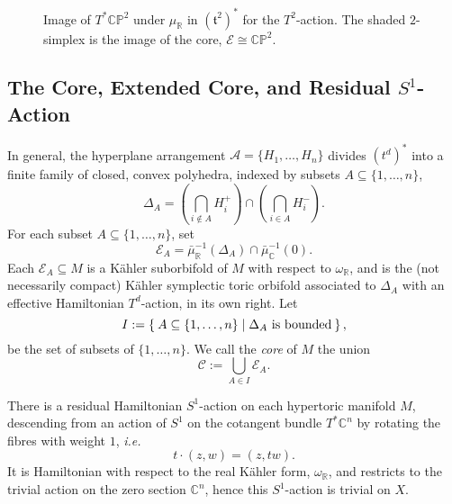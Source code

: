 \documentclass{amsart}
\newcommand{\ie}{\emph{i.e.} }
\newcommand{\w}{\omega}
\newcommand{\PP}{\mathbb{P}}
\newcommand{\RR}{\mathbb{R}}
\newcommand{\CC}{\mathbb{C}}
\newcommand{\mcA}{\mathcal{A}}
\newcommand{\mcC}{\mathcal{C}}
\newcommand{\mcE}{\mathcal{E}}
\newcommand{\mft}{\mathfrak{t}}
\begin{document}
	\begin{figure}[h!]
		\centering
		\caption{Image of $T^{\ast}\CC\PP^{2}$ under $\mu_{\RR}$ in $(\mft^{2})^{\ast}$ for the $T^{2}$-action. The shaded $2$-simplex is the image of the core, $\mcE \cong \CC\PP^{2}$.} \label{fig:TCP2-moment-image}
	\end{figure}
		
	\subsection{The Core, Extended Core, and Residual $S^{1}$-Action}
	
	In general, the hyperplane arrangement $\mcA = \{H_{1}, \ldots, H_{n} \}$ divides $(t^{d})^{\ast}$ into a finite family of closed, convex polyhedra, indexed by subsets $A \subseteq \{1,\ldots, n\}$,
	\[
	\Delta_{A} = \left(\bigcap_{i \not\in A} H_{i}^{+} \right) \cap \left(\bigcap_{i \in A} H_{i}^{-} \right).
	\]
	For each subset $A \subseteq \{1, \ldots, n\}$, set
	\[
	\mcE_{A} = \bar{\mu}_{\RR}^{-1}(\Delta_{A})\cap \bar{\mu}_{\CC}^{-1}(0).
	\]
	Each $\mcE_{A} \subseteq M$ is a K\"ahler suborbifold of $M$ with respect to $\w_{\RR}$, and is the (not necessarily compact) K\"ahler symplectic toric orbifold associated to $\Delta_{A}$ with an effective Hamiltonian $T^{d}$-action, in its own right. Let
	\[
		I := \Set{A \subseteq \{1, \ldots, n\} | \Delta_{A} \text{ is bounded}},
	\]
	be the set of subsets of $\{1, \ldots, n\}$. We call the \emph{core} of $M$ the union
	\[
		\mcC := \bigcup_{A \in I} \mcE_{A}.
	\]
	
	There is a residual Hamiltonian $S^{1}$-action on each hypertoric manifold $M$, descending from an action of $S^{1}$ on the cotangent bundle $T^{\ast}\CC^{n}$ by rotating the fibres with weight $1$, \ie
	\[
		t\cdot (z,w) = (z,tw).
	\]
	It is Hamiltonian with respect to the real K\"ahler form, $\w_{\RR}$, and restricts to the trivial action on the zero section $\CC^{n}$, hence this $S^{1}$-action is trivial on $X$.
	
\end{document}
